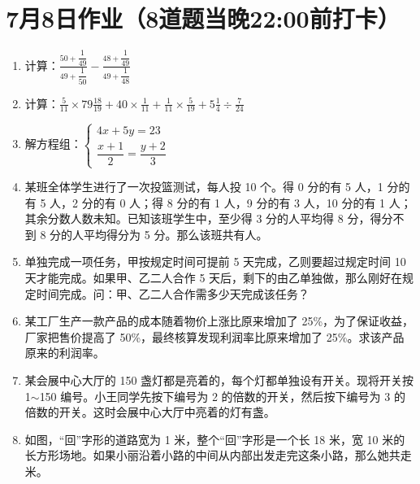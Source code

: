 \documentclass[UTF8,12pt,a4paper]{ctexart}
\newcommand{\BottomWriteSpace}{0.5cm}
\newenvironment{OnePageEightFill}{
  \small
  \vspace*{0pt}
  \begin{enumerate}[leftmargin=*, itemsep=0pt, topsep=0pt, parsep=0pt, partopsep=0pt]
  \setlength{\parskip}{0pt}
}{
  \end{enumerate}
  \vspace*{\BottomWriteSpace}
  \normalsize
  \newpage
}
\newcommand{\Q}[1]{\item #1\par\vfill}
\newcommand{\Qlast}[1]{\item #1\par}
\begin{document}
\section*{7月8日作业（8道题当晚22:00前打卡）}
\begin{OnePageEightFill}

\Q{计算：$\displaystyle \frac{50 + \dfrac{1}{49}}{49 + \dfrac{1}{50}} - \frac{48 + \dfrac{1}{49}}{49 + \dfrac{1}{48}}$}

\Q{计算：$\displaystyle \frac{5}{11} \times 79\frac{18}{19} + 40 \times \frac{1}{11} + \frac{1}{11} \times \frac{5}{19} + 5\frac{1}{4} \div \frac{7}{24}$}

\Q{解方程组：$\begin{cases} 4x + 5y = 23 \\ \dfrac{x+1}{2} = \dfrac{y+2}{3} \end{cases}$}

\Q{某班全体学生进行了一次投篮测试，每人投 10 个。得 0 分的有 5 人，1 分的有 5 人，2 分的有 0 人；得 8 分的有 1 人，9 分的有 3 人，10 分的有 1 人；其余分数人数未知。已知该班学生中，至少得 3 分的人平均得 8 分，得分不到 8 分的人平均得分为 5 分。那么该班共有\underline{\hspace{3em}}人。}

\Q{单独完成一项任务，甲按规定时间可提前 5 天完成，乙则要超过规定时间 10 天才能完成。如果甲、乙二人合作 5 天后，剩下的由乙单独做，那么刚好在规定时间完成。问：甲、乙二人合作需多少天完成该任务？}

\Q{某工厂生产一款产品的成本随着物价上涨比原来增加了 25\%，为了保证收益，厂家把售价提高了 50\%，最终核算发现利润率比原来增加了 25\%。求该产品原来的利润率。}

\Q{某会展中心大厅的 150 盏灯都是亮着的，每个灯都单独设有开关。现将开关按 1$\sim$150 编号。小王同学先按下编号为 2 的倍数的开关，然后按下编号为 3 的倍数的开关。这时会展中心大厅中亮着的灯有\underline{\hspace{3em}}盏。}

\Qlast{如图，“回”字形的道路宽为 1 米，整个“回”字形是一个长 18 米，宽 10 米的长方形场地。如果小丽沿着小路的中间从内部出发走完这条小路，那么她共走\underline{\hspace{3em}}米。}

\end{OnePageEightFill}

\end{document}
